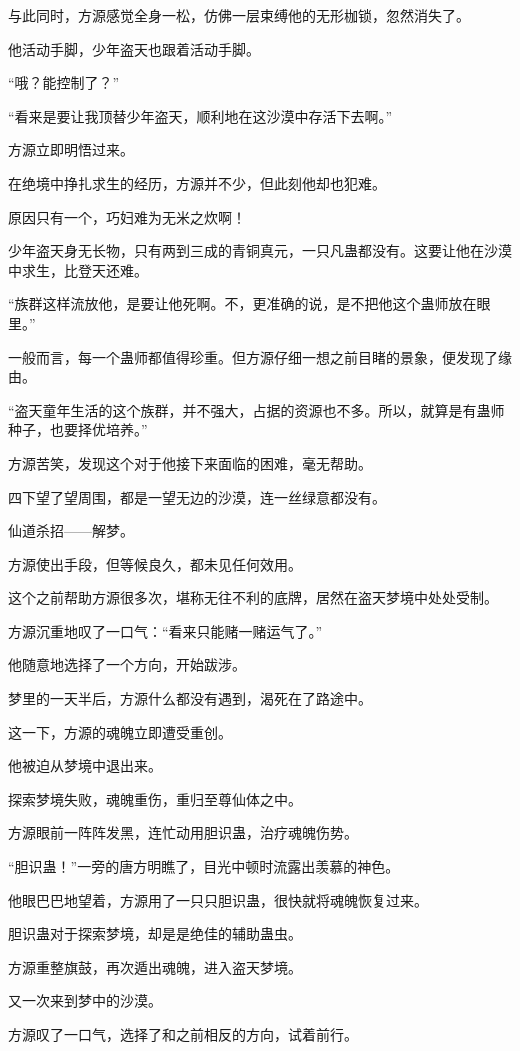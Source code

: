 \begin{this_body}
与此同时，方源感觉全身一松，仿佛一层束缚他的无形枷锁，忽然消失了。

他活动手脚，少年盗天也跟着活动手脚。

“哦？能控制了？”

“看来是要让我顶替少年盗天，顺利地在这沙漠中存活下去啊。”

方源立即明悟过来。

在绝境中挣扎求生的经历，方源并不少，但此刻他却也犯难。

原因只有一个，巧妇难为无米之炊啊！

少年盗天身无长物，只有两到三成的青铜真元，一只凡蛊都没有。这要让他在沙漠中求生，比登天还难。

“族群这样流放他，是要让他死啊。不，更准确的说，是不把他这个蛊师放在眼里。”

一般而言，每一个蛊师都值得珍重。但方源仔细一想之前目睹的景象，便发现了缘由。

“盗天童年生活的这个族群，并不强大，占据的资源也不多。所以，就算是有蛊师种子，也要择优培养。”

方源苦笑，发现这个对于他接下来面临的困难，毫无帮助。

四下望了望周围，都是一望无边的沙漠，连一丝绿意都没有。

仙道杀招——解梦。

方源使出手段，但等候良久，都未见任何效用。

这个之前帮助方源很多次，堪称无往不利的底牌，居然在盗天梦境中处处受制。

方源沉重地叹了一口气：“看来只能赌一赌运气了。”

他随意地选择了一个方向，开始跋涉。

梦里的一天半后，方源什么都没有遇到，渴死在了路途中。

这一下，方源的魂魄立即遭受重创。

他被迫从梦境中退出来。

探索梦境失败，魂魄重伤，重归至尊仙体之中。

方源眼前一阵阵发黑，连忙动用胆识蛊，治疗魂魄伤势。

“胆识蛊！”一旁的唐方明瞧了，目光中顿时流露出羡慕的神色。

他眼巴巴地望着，方源用了一只只胆识蛊，很快就将魂魄恢复过来。

胆识蛊对于探索梦境，却是是绝佳的辅助蛊虫。

方源重整旗鼓，再次遁出魂魄，进入盗天梦境。

又一次来到梦中的沙漠。

方源叹了一口气，选择了和之前相反的方向，试着前行。


\end{this_body}
